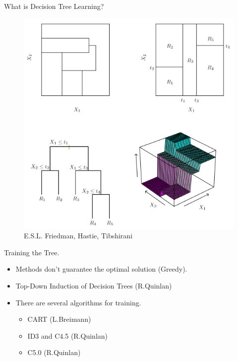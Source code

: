 \documentclass[xcolor={svgnames},
               hyperref={colorlinks,citecolor=DeepPink4,linkcolor=FireBrick,urlcolor=Maroon}]
               {beamer}
\begin{document}
  \begin{frame}{What is Decision Tree Learning?}
            \begin{figure}
              \vspace*{\fill}
              \begin{center}
            \includegraphics[width=.55\textwidth]{ESLDecisionTreeExample.png}
          \caption{E.S.L. Friedman, Hastie, Tibshirani}
              \end{center}
              \vspace*{\fill}
            \end{figure}
  \end{frame}


  
  \begin{frame}{Training the Tree.}
    \begin{itemize}
    \item Methods don't guarantee the optimal solution (Greedy). 
    \vfill
    \item Top-Down Induction of Decision Trees (R.Quinlan)
    \vfill
    \item There are several algorithms for training.
      \begin{itemize}
        \item CART (L.Breimann)
        \item ID3 and C4.5 (R.Quinlan)
        \item C5.0 (R.Quinlan)
      \end{itemize}
    \end{itemize}

  \end{frame}
\end{document}
